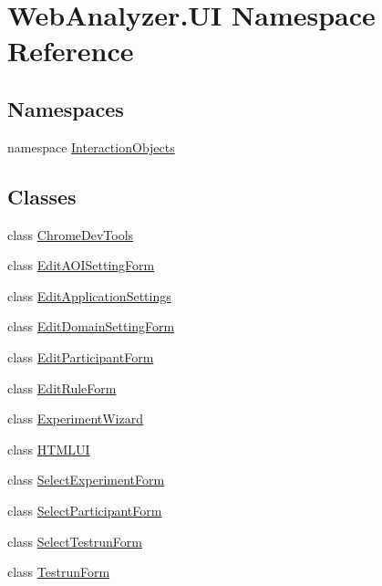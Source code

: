 \hypertarget{namespace_web_analyzer_1_1_u_i}{}\section{Web\+Analyzer.\+U\+I Namespace Reference}
\label{namespace_web_analyzer_1_1_u_i}
\subsection*{Namespaces}
\begin{DoxyCompactItemize}
\item 
namespace \hyperlink{namespace_web_analyzer_1_1_u_i_1_1_interaction_objects}{Interaction\+Objects}
\end{DoxyCompactItemize}
\subsection*{Classes}
\begin{DoxyCompactItemize}
\item 
class \hyperlink{class_web_analyzer_1_1_u_i_1_1_chrome_dev_tools}{Chrome\+Dev\+Tools}
\item 
class \hyperlink{class_web_analyzer_1_1_u_i_1_1_edit_a_o_i_setting_form}{Edit\+A\+O\+I\+Setting\+Form}
\item 
class \hyperlink{class_web_analyzer_1_1_u_i_1_1_edit_application_settings}{Edit\+Application\+Settings}
\item 
class \hyperlink{class_web_analyzer_1_1_u_i_1_1_edit_domain_setting_form}{Edit\+Domain\+Setting\+Form}
\item 
class \hyperlink{class_web_analyzer_1_1_u_i_1_1_edit_participant_form}{Edit\+Participant\+Form}
\item 
class \hyperlink{class_web_analyzer_1_1_u_i_1_1_edit_rule_form}{Edit\+Rule\+Form}
\item 
class \hyperlink{class_web_analyzer_1_1_u_i_1_1_experiment_wizard}{Experiment\+Wizard}
\item 
class \hyperlink{class_web_analyzer_1_1_u_i_1_1_h_t_m_l_u_i}{H\+T\+M\+L\+U\+I}
\item 
class \hyperlink{class_web_analyzer_1_1_u_i_1_1_select_experiment_form}{Select\+Experiment\+Form}
\item 
class \hyperlink{class_web_analyzer_1_1_u_i_1_1_select_participant_form}{Select\+Participant\+Form}
\item 
class \hyperlink{class_web_analyzer_1_1_u_i_1_1_select_testrun_form}{Select\+Testrun\+Form}
\item 
class \hyperlink{class_web_analyzer_1_1_u_i_1_1_testrun_form}{Testrun\+Form}
\end{DoxyCompactItemize}
